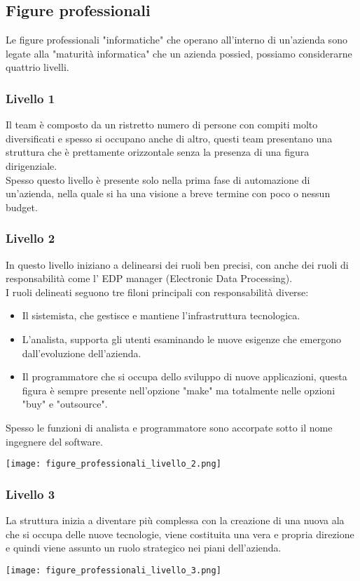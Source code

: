\documentclass[../main.tex]{subfiles}
\begin{document}
	\subsection{Figure professionali}
	Le figure professionali "informatiche" che operano all'interno di un'azienda sono legate alla "maturità informatica" che un azienda possied,
	possiamo considerarne quattrio livelli.

	\subsubsection{Livello 1}
	Il team è composto da un ristretto numero di persone con compiti molto diversificati e spesso si occupano anche di altro, questi team presentano una struttura che è prettamente orizzontale senza la presenza di una figura dirigenziale.\\
	Spesso questo livello è presente solo nella prima fase di automazione di un'azienda, nella quale si ha una visione a breve termine con poco o nessun budget.

	\subsubsection{Livello 2}
	In questo livello iniziano a delinearsi dei ruoli ben precisi, con anche dei ruoli di responsabilità come l' EDP manager (Electronic Data Processing).\\
	I ruoli delineati seguono tre filoni principali con responsabilità diverse:
	\begin{itemize}
		\item Il sistemista, che gestisce e mantiene l'infrastruttura tecnologica.
		\item L'analista, supporta gli utenti esaminando le nuove esigenze che emergono dall'evoluzione dell'azienda.
		\item Il programmatore che si occupa dello sviluppo di nuove applicazioni, questa figura è sempre presente nell'opzione "make" ma totalmente nelle opzioni "buy" e "outsource".
	\end{itemize}
	Spesso le funzioni di analista e programmatore sono accorpate sotto il nome ingegnere del software.
	\begin{center}
		\texttt{[image: figure\_professionali\_livello\_2.png]}
	\end{center}

	\subsubsection{Livello 3}
	La struttura inizia a diventare più complessa con la creazione di una nuova ala che si occupa delle nuove tecnologie, viene costituita una vera e propria direzione e quindi viene assunto un ruolo strategico nei piani dell'azienda.
	\begin{center}
		\texttt{[image: figure\_professionali\_livello\_3.png]}
	\end{center}
\end{document}
